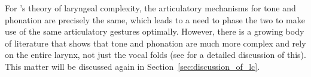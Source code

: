 
        
        

For \citeauthor{silvermanLaryngealComplexityOtomanguean1997}'s \citeyear{silvermanLaryngealComplexityOtomanguean1997} theory of laryngeal complexity, the articulatory mechanisms for tone and phonation are precisely the same, which leads to a need to phase the two to make use of the same articulatory gestures optimally. However, there is a growing body of literature that shows that tone and phonation are much more complex and rely on the entire larynx, not just the vocal folds (see \cite{eslingVoiceQualityLaryngeal2019} for a detailed discussion of this). This matter will be discussed again in Section~\ref{sec:discussion_of_lc}.

